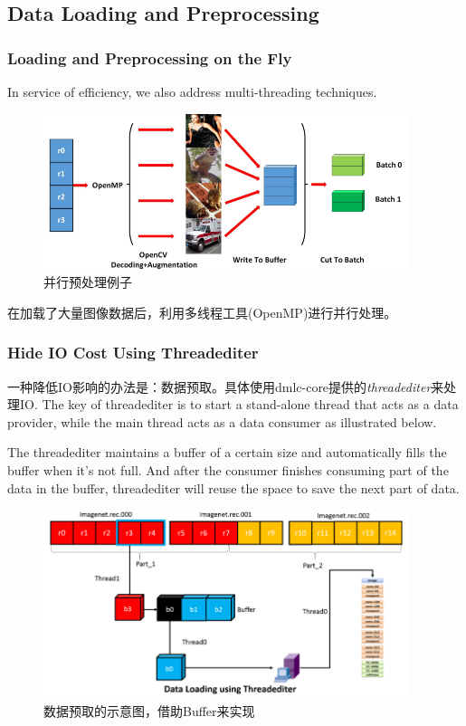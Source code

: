 \subsection{Data Loading and Preprocessing}

\subsubsection{Loading and Preprocessing on the Fly}

In service of efficiency, we also address multi-threading techniques. 

\begin{figure}[!hbtp]
\centering
\includegraphics[width=0.95\textwidth]{MXNet/loadingData1.png}
\caption{并行预处理例子}
\label{loadingData1}
\end{figure}

在加载了大量图像数据后，利用多线程工具(OpenMP)进行并行处理。

\subsubsection{Hide IO Cost Using Threadediter}

一种降低IO影响的办法是：数据预取。具体使用dmlc-core提供的\textit{threadediter}来处理IO. The key of threadediter is to start a stand-alone thread that acts as a data provider, while the main thread acts as a data consumer as illustrated below.

The threadediter maintains a buffer of a certain size and automatically fills the buffer when it’s not full. And after the consumer finishes consuming part of the data in the buffer, threadediter will reuse the space to save the next part of data. 

\begin{figure}[!hbtp]
\centering
\includegraphics[width=0.95\textwidth]{MXNet/dataLoading2.png}
\caption{数据预取的示意图，借助Buffer来实现}
\label{loadingData2}
\end{figure}


